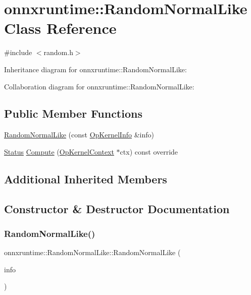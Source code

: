 \hypertarget{classonnxruntime_1_1RandomNormalLike}{}\section{onnxruntime\+:\+:Random\+Normal\+Like Class Reference}
\label{classonnxruntime_1_1RandomNormalLike}


{\ttfamily \#include $<$random.\+h$>$}



Inheritance diagram for onnxruntime\+:\+:Random\+Normal\+Like\+:


Collaboration diagram for onnxruntime\+:\+:Random\+Normal\+Like\+:
\subsection*{Public Member Functions}
\begin{DoxyCompactItemize}
\item 
\mbox{\hyperlink{classonnxruntime_1_1RandomNormalLike_a3da8c208a95f06c37f2faa2780181114}{Random\+Normal\+Like}} (const \mbox{\hyperlink{classonnxruntime_1_1OpKernelInfo}{Op\+Kernel\+Info}} \&info)
\item 
\mbox{\hyperlink{classonnxruntime_1_1common_1_1Status}{Status}} \mbox{\hyperlink{classonnxruntime_1_1RandomNormalLike_a68db6b9ed1cad3eba8c18e11b8397138}{Compute}} (\mbox{\hyperlink{classonnxruntime_1_1OpKernelContext}{Op\+Kernel\+Context}} $\ast$ctx) const override
\end{DoxyCompactItemize}
\subsection*{Additional Inherited Members}


\subsection{Constructor \& Destructor Documentation}
\mbox{\label{classonnxruntime_1_1RandomNormalLike_a3da8c208a95f06c37f2faa2780181114}} 
\subsubsection{\texorpdfstring{Random\+Normal\+Like()}{RandomNormalLike()}}
{\footnotesize\ttfamily onnxruntime\+::\+Random\+Normal\+Like\+::\+Random\+Normal\+Like (\begin{DoxyParamCaption}\item[{const \mbox{\hyperlink{classonnxruntime_1_1OpKernelInfo}{Op\+Kernel\+Info}} \&}]{info }\end{DoxyParamCaption})\hspace{0.3cm}{\ttfamily [inline]}}



